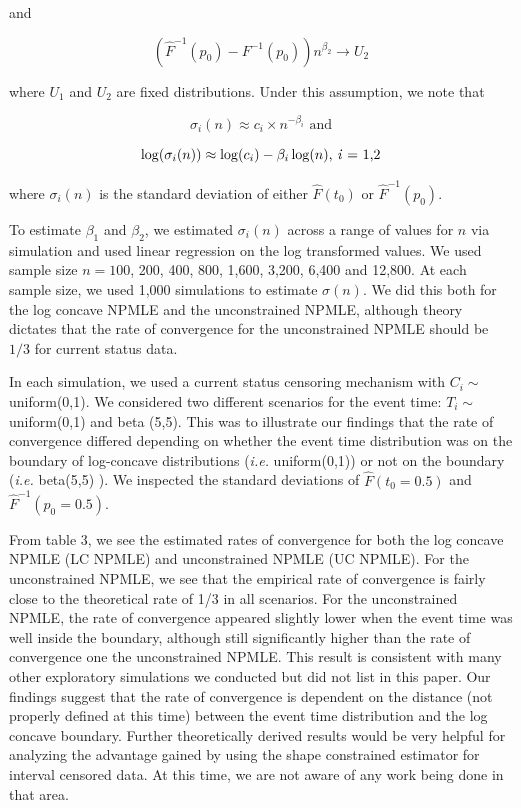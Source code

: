 \documentclass[10pt]{article}
\begin{document}
	and
	
	\[ (\hat F^{-1}(p_0) - F^{-1}(p_0) ) n^{\beta_2} \rightarrow U_2 \]
		
	where $U_1$ and $U_2$ are fixed distributions. Under this assumption, we note that 
	
	\[ \sigma_i (n) \approx c_i \times n^{-\beta_i} \text{ and}	\]
		
	\[ \log( \sigma_i (n) ) \approx \log(c_i) - \beta_i \log(n) \text{, \emph{i} = 1,2} \]	
		
	where $\sigma_i(n)$ is the standard deviation of either $\hat F(t_0)$ or $\hat F^{-1}(p_0)$. 	
	
	To estimate $\beta_1$ and $\beta_2$, we estimated $\sigma_i(n)$ across a range of values for $n$ via simulation and used linear regression on the log transformed values. We used sample size $n = 100$, 200, 400, 800, 1,600, 3,200, 6,400 and 12,800. At each sample size, we used 1,000 simulations to estimate $\sigma(n)$.  We did this both for the log concave NPMLE and the unconstrained NPMLE, although theory dictates that the rate of convergence for the unconstrained NPMLE should be $1/3$ for current status data.  
	
	In each simulation, we used a current status censoring mechanism with $C_i \sim $ uniform(0,1). We considered two different scenarios for the event time: $T_i \sim $ uniform(0,1) and beta (5,5). This was to illustrate our findings that the rate of convergence differed depending on whether the event time distribution was on the boundary of log-concave distributions (\emph{i.e.} uniform(0,1)) or not on the boundary (\emph{i.e.} beta(5,5) ). We inspected the standard deviations of $\hat F(t_0 = 0.5)$ and $\hat F^{-1}( p_0 = 0.5)$.
		
	From table 3, we see the estimated rates of convergence for both the log concave NPMLE (LC NPMLE) and unconstrained NPMLE (UC NPMLE). For the unconstrained NPMLE, we see that the empirical rate of convergence is fairly close to the theoretical rate of 1/3 in all scenarios. For the unconstrained NPMLE, the rate of convergence appeared slightly lower when the event time was well inside the boundary, although still significantly higher than the rate of convergence one the unconstrained NPMLE. This result is consistent with many other exploratory simulations we conducted but did not list in this paper. Our findings suggest that the rate of convergence is dependent on the distance (not properly defined at this time) between the event time distribution and the log concave boundary. Further theoretically derived results would be very helpful for analyzing the advantage gained by using the shape constrained estimator for interval censored data. At this time, we are not aware of any work being done in that area. 
\end{document}
